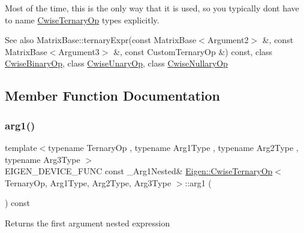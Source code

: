Most of the time, this is the only way that it is used, so you typically don\textquotesingle{}t have to name \mbox{\hyperlink{class_eigen_1_1_cwise_ternary_op}{Cwise\+Ternary\+Op}} types explicitly.

\begin{DoxySeeAlso}{See also}
Matrix\+Base\+::ternary\+Expr(const Matrix\+Base$<$\+Argument2$>$ \&, const Matrix\+Base$<$\+Argument3$>$ \&, const Custom\+Ternary\+Op \&) const, class \mbox{\hyperlink{class_eigen_1_1_cwise_binary_op}{Cwise\+Binary\+Op}}, class \mbox{\hyperlink{class_eigen_1_1_cwise_unary_op}{Cwise\+Unary\+Op}}, class \mbox{\hyperlink{class_eigen_1_1_cwise_nullary_op}{Cwise\+Nullary\+Op}} 
\end{DoxySeeAlso}


\subsection{Member Function Documentation}
\mbox{\label{class_eigen_1_1_cwise_ternary_op_a37ec6f7c9b863f58a3e193cac44bdd82}} 
\subsubsection{\texorpdfstring{arg1()}{arg1()}}
{\footnotesize\ttfamily template$<$typename Ternary\+Op , typename Arg1\+Type , typename Arg2\+Type , typename Arg3\+Type $>$ \\
E\+I\+G\+E\+N\+\_\+\+D\+E\+V\+I\+C\+E\+\_\+\+F\+U\+NC const \+\_\+\+Arg1\+Nested\& \mbox{\hyperlink{class_eigen_1_1_cwise_ternary_op}{Eigen\+::\+Cwise\+Ternary\+Op}}$<$ Ternary\+Op, Arg1\+Type, Arg2\+Type, Arg3\+Type $>$\+::arg1 (\begin{DoxyParamCaption}{ }\end{DoxyParamCaption}) const\hspace{0.3cm}{\ttfamily [inline]}}

\begin{DoxyReturn}{Returns}
the first argument nested expression 
\end{DoxyReturn}
\mbox{\label{class_eigen_1_1_cwise_ternary_op_a271606675838696dd7660d4d847ae5f7}} 
